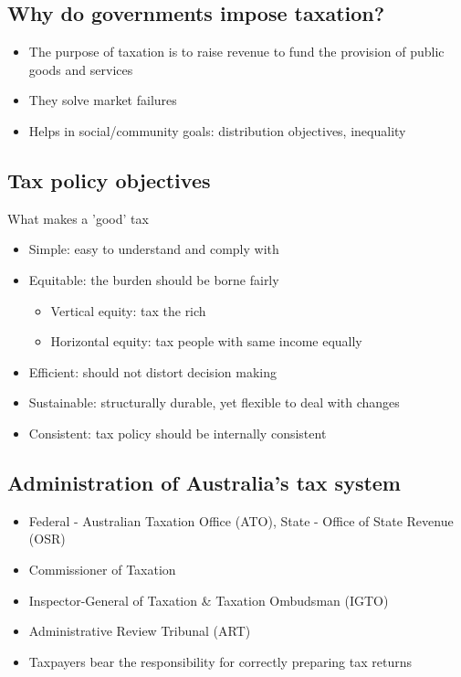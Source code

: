 \documentclass{article}
\begin{document}
	\subsection{Why do governments impose taxation?}

		\begin{itemize}
			\item The purpose of taxation is to raise revenue to fund the provision of public goods and services
			\item They solve market failures
			\item Helps in social/community goals: distribution objectives, inequality
		\end{itemize}

	\subsection{Tax policy objectives}

		What makes a 'good' tax
		\begin{itemize}
			\item Simple: easy to understand and comply with
			\item Equitable: the burden should be borne fairly
				\begin{itemize}
					\item Vertical equity: tax the rich
					\item Horizontal equity: tax people with same income equally
				\end{itemize}
			\item Efficient: should not distort decision making
			\item Sustainable: structurally durable, yet flexible to deal with changes
			\item Consistent: tax policy should be internally consistent
		\end{itemize}

	\subsection{Administration of Australia's tax system}
		
		\begin{itemize}
			\item Federal - Australian Taxation Office (ATO), State - Office of State Revenue (OSR)
			\item Commissioner of Taxation
			\item Inspector-General of Taxation & Taxation Ombudsman (IGTO)
			\item Administrative Review Tribunal (ART)
			\item Taxpayers bear the responsibility for correctly preparing tax returns
		\end{itemize}
\end{document}
